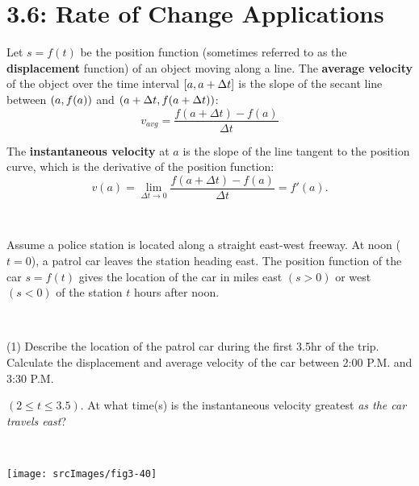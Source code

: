\documentclass[mathNotesPreamble]{subfiles}
\begin{document}
\section{3.6: Rate of Change Applications}
\begin{defn*}
  Let $s=f(t)$ be the position function (sometimes referred to as the \textbf{displacement} function) of an object moving along a line. The \textbf{average velocity} of the object over the time interval ${\left[a,a+\Delta t\right]}$ is the slope of the secant line between ${\left(a,f(a)\right)}$ and ${\left(a+\Delta t,f(a+\Delta t)\right)}$:
    $$v_{avg}=\frac{f(a+\Delta t)-f(a)}{\Delta t}$$
  
  The \textbf{instantaneous velocity} at $a$ is the slope of the line tangent to the position curve, which is the derivative of the position function:
    $$v(a)=\lim_{\Delta t \to 0} \frac{f(a+\Delta t)-f(a)}{\Delta t}=f'(a).$$
\end{defn*}

\begin{ex*}\ 

\noindent
Assume a police station is located along a straight east-west freeway. At noon ($t=0$), a patrol car leaves the station heading east. The position function of the car $s=f(t)$ gives the location of the car in miles east $(s>0)$ or west $(s<0)$ of the station $t$ hours after noon.
\end{ex*}
\vspace*{-20pt}
\begin{minipage}[t]{0.6\linewidth}\ 

  \begin{tasks}(1)
    \task Describe the location of the patrol car during the first 3.5hr of the trip.
    \task Calculate the displacement and average velocity of the car between 2:00 P.M. and 3:30 P.M. 
    
    $(2\leq t\leq3.5)$.
    \task At what time(s) is the instantaneous velocity greatest \textit{as the car travels east}?
  \end{tasks}
\end{minipage}%
\begin{minipage}[t]{0.4\linewidth}\ 

  \begin{flushright}
    \texttt{[image: srcImages/fig3-40]}
  \end{flushright}
\end{minipage}
\end{document}
